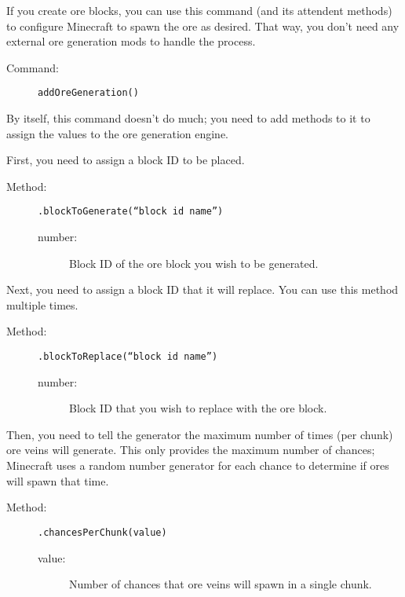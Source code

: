 \documentclass[letterpaper,titlepage,12pt]{article}
\begin{document}
If you create ore blocks, you can use this command (and its attendent methods) to configure Minecraft to spawn the ore as desired.  That way, you don't need any external ore generation mods to handle the process.

\begin{description}
\item[Command:] \texttt{addOreGeneration()}
\end{description}

By itself, this command doesn't do much; you need to add methods to it to assign the values to the ore generation engine.

First, you need to assign a block ID to be placed.

\begin{description}
\item[Method:] \texttt{.blockToGenerate(``block id name'')}
\begin{description}
\item [number:] Block ID of the ore block you wish to be generated.
\end{description}
\end{description}

Next, you need to assign a block ID that it will replace.  You can use this method multiple times.

\begin{description}
\item[Method:] \texttt{.blockToReplace(``block id name'')}
\begin{description}
\item [number:] Block ID that you wish to replace with the ore block.
\end{description}
\end{description}

Then, you need to tell the generator the maximum number of times (per chunk) ore veins will generate.  This only provides the maximum number of chances; Minecraft uses a random number generator for each chance to determine if ores will spawn that time.

\begin{description}
\item[Method:] \texttt{.chancesPerChunk(value)}
\begin{description}
\item [value:] Number of chances that ore veins will spawn in a single chunk.
\end{description}
\end{description}
\end{document}
